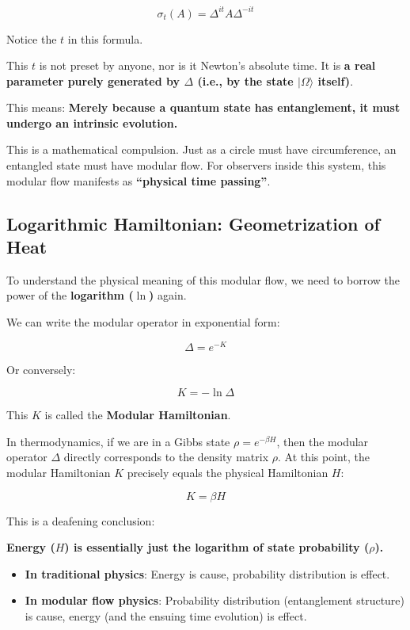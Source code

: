 $$\sigma_t(A) = \Delta^{it} A \Delta^{-it}$$

Notice the $t$ in this formula.

This $t$ is not preset by anyone, nor is it Newton's absolute time. It is \textbf{a real parameter purely generated by $\Delta$ (i.e., by the state $|\Omega\rangle$ itself)}.

This means: \textbf{Merely because a quantum state has entanglement, it must undergo an intrinsic evolution.}

This is a mathematical compulsion. Just as a circle must have circumference, an entangled state must have modular flow. For observers inside this system, this modular flow manifests as \textbf{``physical time passing''}.

\subsection{Logarithmic Hamiltonian: Geometrization of Heat}

To understand the physical meaning of this modular flow, we need to borrow the power of the \textbf{logarithm ($\ln$)} again.

We can write the modular operator in exponential form:

$$\Delta = e^{-K}$$

Or conversely:

$$K = -\ln \Delta$$

This $K$ is called the \textbf{Modular Hamiltonian}.

In thermodynamics, if we are in a Gibbs state $\rho = e^{-\beta H}$, then the modular operator $\Delta$ directly corresponds to the density matrix $\rho$. At this point, the modular Hamiltonian $K$ precisely equals the physical Hamiltonian $H$:

$$K = \beta H$$

This is a deafening conclusion:

\textbf{Energy ($H$) is essentially just the logarithm of state probability ($\rho$).}

\begin{itemize}
\item \textbf{In traditional physics}: Energy is cause, probability distribution is effect.

\item \textbf{In modular flow physics}: Probability distribution (entanglement structure) is cause, energy (and the ensuing time evolution) is effect.
\end{itemize}

